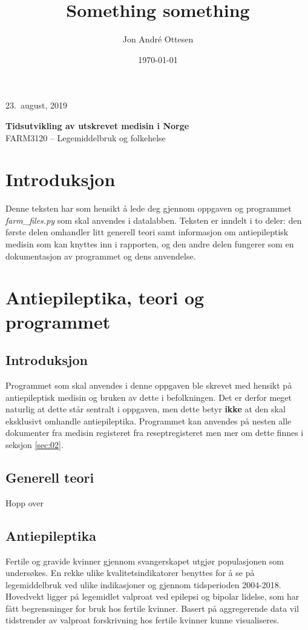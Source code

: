 \documentclass[12pt,norsk,a4paper,fleqn]{article}
\title{Something something}
\author{Jon André Ottesen}
\date{\today}
\numberwithin{equation}{section}
\newcommand{\blank}[1]{\hspace*{#1}\linebreak[0]}
\begin{document}
\begin{flushright}
\small 23.~august, 2019
\end{flushright}
\textbf{\blank{-10mm}\LARGE Tidsutvikling av utskrevet medisin i Norge}\\
\blank{0mm}FARM3120 – Legemiddelbruk og folkehelse\\
\blank{0mm}{\small Jon André Ottesen}


\section*{Introduksjon}

Denne teksten har som hensikt å lede deg gjennom oppgaven og programmet \textit{farm\_files.py} som skal anvendes i datalabben. Teksten er inndelt i to deler: den første delen omhandler litt generell teori samt informasjon om antiepileptisk medisin som kan knyttes inn i rapporten, og den andre delen fungerer som en dokumentasjon av programmet og dens anvendelse. 


\newpage

\section{Antiepileptika, teori og programmet} \label{sec:01}

\subsection*{Introduksjon}

Programmet som skal anvendes i denne oppgaven ble skrevet med hensikt på antiepileptisk medisin og bruken av dette i befolkningen. Det er derfor meget naturlig at dette står sentralt i oppgaven, men dette betyr \textbf{ikke} at den skal eksklusivt omhandle antiepileptika. Programmet kan anvendes på nesten alle dokumenter fra medisin registeret fra reseptregisteret men mer om dette finnes i seksjon \ref{sec:02}.

\subsection*{Generell teori}

Hopp over

\subsection*{Antiepileptika}

Fertile og gravide kvinner gjennom svangerskapet utgjør populasjonen som undersøkes. En rekke ulike kvalitetsindikatorer benyttes for å se på legemiddelbruk ved ulike indikasjoner og gjennom tidsperioden 2004-2018. Hovedvekt ligger på legemidlet valproat ved epilepsi og bipolar lidelse, som har fått begrensninger for bruk hos fertile kvinner. Basert på aggregerende data vil tidstrender av valproat forskrivning hos fertile kvinner kunne visualiseres.
\end{document}
